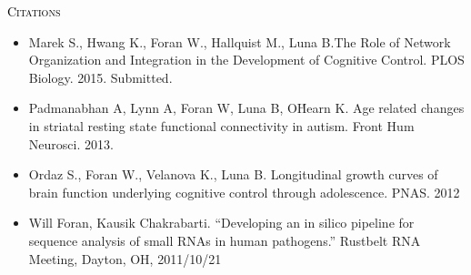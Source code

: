 \begin{minipage}{\firstWidth}
\large \textcolor{Black}{\textsc{Citations}}
\end{minipage}
\begin{minipage}{\secondWidth}
\begin{itemize}
   \item Marek S., Hwang K., Foran W., Hallquist M., Luna B.The Role of Network Organization and Integration in the Development of Cognitive Control. PLOS Biology. 2015. Submitted.
   \item Padmanabhan A, Lynn A, Foran W, Luna B, O\'Hearn K. Age related changes in striatal resting state functional connectivity in autism.  Front Hum Neurosci. 2013.
   \item  Ordaz S., Foran W., Velanova K., Luna B. Longitudinal growth curves of brain function underlying cognitive control through adolescence. PNAS. 2012
   \item Will Foran, Kausik Chakrabarti. ``Developing an in silico pipeline for sequence analysis of small RNAs in human pathogens.'' Rustbelt RNA Meeting, Dayton, OH, 2011/10/21
\end{itemize}
\end{minipage}

